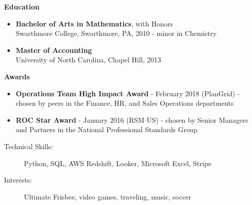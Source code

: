 \documentclass[10pt]{article}
\begin{document}
  {\large \textbf{Education}}

  \begin{itemize}
    \item 
      \textbf{Bachelor of Arts in Mathematics}, with Honors \\
      Swarthmore College, Swarthmore, PA, 2010 - minor in Chemistry \\

    \item
      \textbf{Master of Accounting} \\
      University of North Carolina, Chapel Hill, 2013 \\

  \end{itemize}

  {\large \textbf{Awards}}
  \begin{itemize}
    \item  \textbf{Operations Team High Impact Award} - February 2018 (PlanGrid) - chosen by peers in the Finance, HR, and Sales Operations departments
    \item \textbf{ROC Star Award} - January 2016 (RSM US) - chosen by Senior Managers and Partners in the National Professional Standards Group
  \end{itemize}

  \begin{description}

    \item[Technical Skills:]
Python, SQL, AWS Redshift, Looker, Microsoft Excel, Stripe

    \item[Interests:]
Ultimate Frisbee, video games, traveling, music, soccer

  \end{description}
\end{document}
